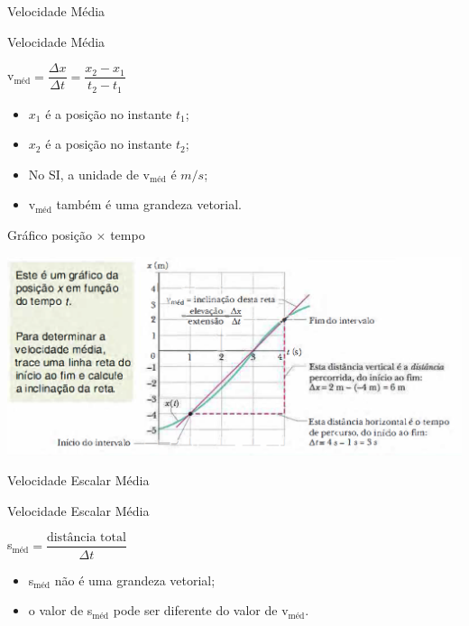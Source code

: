 \documentclass[xcolor=dvipsnames,table]{beamer}
\begin{document}
	\begin{frame}{Velocidade Média}
		\begin{block}{Velocidade Média}
			\begin{center}
				v$_{\mbox{méd}} = \dfrac{\Delta x}{\Delta t} = \dfrac{x_2 - x_1}{t_2 - t_1}$
			\end{center} 
			\begin{itemize}
				\item $x_1$ é a posição no instante $t_1$;
				\item $x_2$ é a posição no instante $t_2$; 
				\item No SI, a unidade de v$_{\mbox{méd}}$ é $m/s$; 
				\item v$_{\mbox{méd}}$ também é uma grandeza vetorial.
			\end{itemize}
		\end{block}
	\end{frame}

	\begin{frame}{Gráfico posição $\times$ tempo}
		\begin{center}
			\includegraphics[scale=0.35]{images/fig2-4}
		\end{center}
	\end{frame}

	\begin{frame}{Velocidade Escalar Média}
		\begin{block}{Velocidade Escalar Média}
			\begin{center}
				s$_{\mbox{méd}} = \dfrac{\mbox{distância total}}{\Delta t} $
			\end{center} 
			\begin{itemize}
				\item s$_{\mbox{méd}}$ não é uma grandeza vetorial;
				\item o valor de s$_{\mbox{méd}}$ pode ser diferente do valor de v$_{\mbox{méd}}$.
			\end{itemize}
		\end{block}
	\end{frame}
\end{document}
